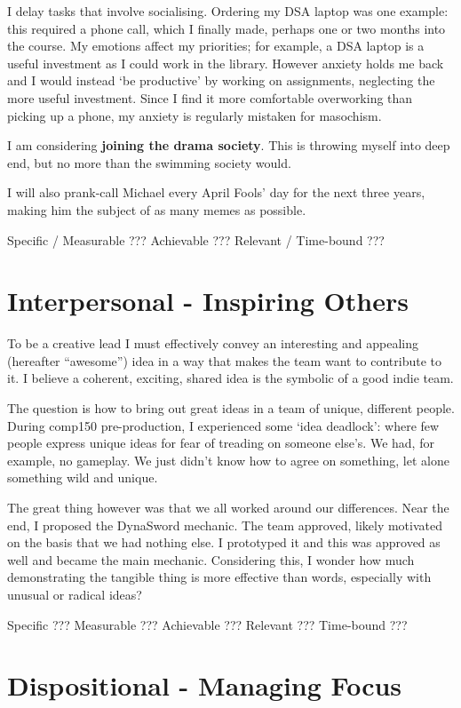 \documentclass{scrartcl}
\begin{document}
I delay tasks that involve socialising. Ordering my DSA laptop was one example: this required a phone call, which I finally made, perhaps one or two months into the course. My emotions affect my priorities; for example, a DSA laptop is a useful investment as I could work in the library. However anxiety holds me back and I would instead `be productive' by working on assignments, neglecting the more useful investment. Since I find it more comfortable overworking than picking up a phone, my anxiety is regularly mistaken for masochism.

I am considering \textbf{joining the drama society}. This is throwing myself into deep end, but no more than the swimming society would. 

I will also prank-call Michael every April Fools' day for the next three years, making him the subject of as many memes as possible.

Specific    /
Measurable ???
Achievable ???
Relevant    /
Time-bound ???

\section{Interpersonal - Inspiring Others}

To be a creative lead I must effectively convey an interesting and appealing (hereafter ``awesome'') idea in a way that makes the team want to contribute to it. I believe a coherent, exciting, shared idea is the symbolic of a good indie team.

The question is how to bring out great ideas in a team of unique, different people. During comp150 pre-production, I experienced some `idea deadlock': where few people express unique ideas for fear of treading on someone else's. We had, for example, no gameplay. We just didn't know how to agree on something, let alone something wild and unique.

The great thing however was that we all worked around our differences. Near the end, I proposed the DynaSword mechanic. The team approved, likely motivated on the basis that we had nothing else. I prototyped it and this was approved as well and became the main mechanic. Considering this, I wonder how much demonstrating the tangible thing is more effective than words, especially with unusual or radical ideas?

Specific   ???
Measurable ???
Achievable ???
Relevant   ???
Time-bound ???

\section{Dispositional - Managing Focus}
\end{document}
